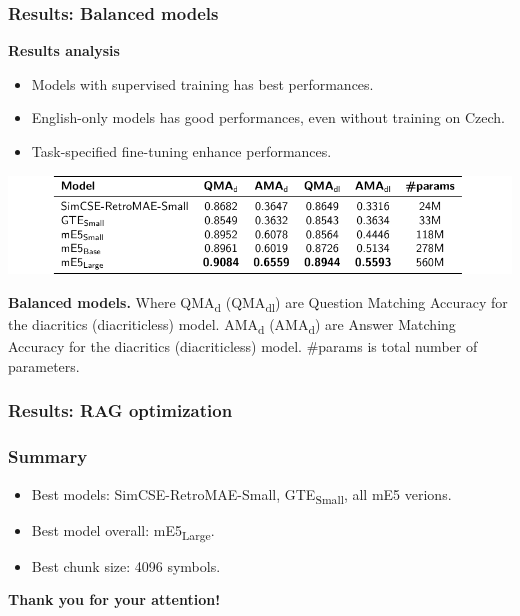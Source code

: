 \documentclass{beamer}
\begin{document}
\begin{frame}
  \frametitle{Results: Balanced models}
  \textcolor{cvut_navy}{\textbf{Results analysis}}
  \begin{itemize}
    \item Models with supervised training has best performances.
    \item English-only models has good performances, even without training on Czech.
    \item Task-specified fine-tuning enhance performances.
  \end{itemize}
  \begin{table}
    \centering
    \includegraphics[scale=0.8]{src/fig/pdfs/tables/balanced.pdf}
    \caption{\textcolor{cvut_navy}{\textbf{Balanced models.}}
    Where QMA\textsubscript{d} (QMA\textsubscript{dl}) are Question Matching Accuracy for the diacritics (diacriticless) model.
    AMA\textsubscript{d} (AMA\textsubscript{d}) are Answer Matching Accuracy for the diacritics (diacriticless) model.
    \#params is total number of parameters.}
  \end{table}
\end{frame}

\begin{frame}
  \frametitle{Results: RAG optimization}
  
\end{frame}

\begin{frame}
  \frametitle{Summary}
  \begin{itemize}
    \item Best models: SimCSE-RetroMAE-Small, GTE\textsubscript{Small}, all mE5 verions.
    \item Best model overall: mE5\textsubscript{Large}.
    \item Best chunk size: 4096 symbols.
  \end{itemize}
  \textcolor{cvut_navy}{\textbf{Thank you for your attention!}}
\end{frame}
\end{document}
